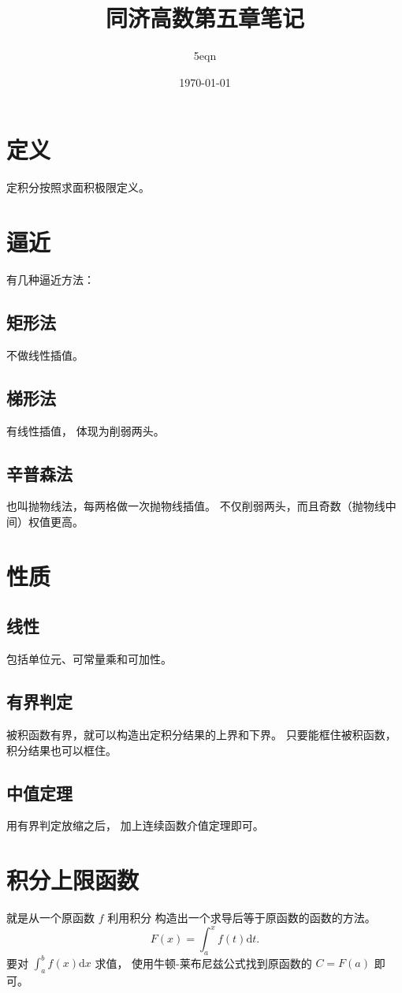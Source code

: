 \documentclass[UTF8,a4paper,11pt]{ctexart}
\title{同济高数第五章笔记}
\author{5eqn}
\date{\today}
\begin{document}
  \maketitle
  \section{定义}
    定积分按照求面积极限定义。
  \section{逼近}
    有几种逼近方法：
    \subsection{矩形法}
      不做线性插值。
    \subsection{梯形法}
      有线性插值，
      体现为削弱两头。
    \subsection{辛普森法}
      也叫抛物线法，每两格做一次抛物线插值。
      不仅削弱两头，而且奇数（抛物线中间）权值更高。
  \section{性质}
    \subsection{线性}
      包括单位元、可常量乘和可加性。
    \subsection{有界判定}
      被积函数有界，就可以构造出定积分结果的上界和下界。
      只要能框住被积函数，积分结果也可以框住。
    \subsection{中值定理}
      用有界判定放缩之后，
      加上连续函数介值定理即可。
  \section{积分上限函数}
    就是从一个原函数 $f$ 利用积分
    构造出一个求导后等于原函数的函数的方法。
    \[
    F(x)=\int_{a}^{x} f(t)\mathrm{d}t 
    .\] 
    要对 $\int_{a}^{b} f(x)\mathrm{d}x $ 求值，
    使用牛顿-莱布尼兹公式找到原函数的 $C=F(a)$ 即可。
\end{document}
